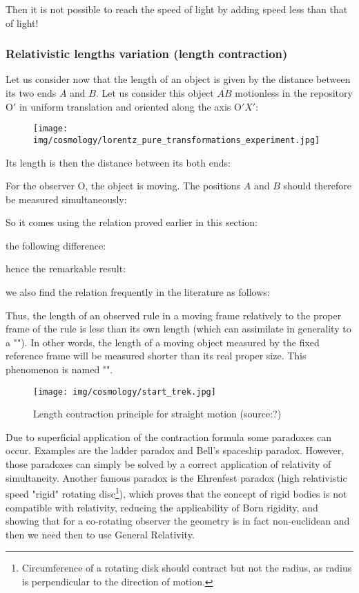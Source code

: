 	Then it is not possible to reach the speed of light by adding speed less than that of light!
	
	\subsubsection{Relativistic lengths variation (length contraction)}
	Let us consider now that the length of an object is given by the distance between its two ends $A$ and $B$. Let us consider this object $\overline{AB}$ motionless in the repository $\text{O}'$ in uniform translation and oriented along the axis $\text{O}'X'$:
	\begin{figure}[H]
		\centering
		\texttt{[image: img/cosmology/lorentz\_pure\_transformations\_experiment.jpg]}	
	\end{figure}
	Its length is then the distance between its both ends:
	
	For the observer O, the object is moving. The positions $A$ and $B$ should therefore be measured simultaneously:
	
	So it comes using the relation proved earlier in this section:
	
	the following difference:
	
	hence the remarkable result:
	
	we also find the relation frequently in the literature as follows:
	
	Thus, the length of an observed rule in a moving frame relatively to the proper frame of the rule is less than its own length (which can assimilate in generality to a ""). In other words, the length of a moving object measured by the fixed reference frame will be measured shorter than its real proper size. This phenomenon is named "".
	\begin{figure}[H]
		\centering
		\texttt{[image: img/cosmology/start\_trek.jpg]}	
		\caption[Length contraction principle for straight motion]{Length contraction principle for straight motion (source:?)}
	\end{figure}
	Due to superficial application of the contraction formula some paradoxes can occur. Examples are the ladder paradox and Bell's spaceship paradox. However, those paradoxes can simply be solved by a correct application of relativity of simultaneity. Another famous paradox is the Ehrenfest paradox (high relativistic speed "rigid" rotating disc\footnote{Circumference of a rotating disk should contract but not the radius, as radius is perpendicular to the direction of motion.}), which proves that the concept of rigid bodies is not compatible with relativity, reducing the applicability of Born rigidity, and showing that for a co-rotating observer the geometry is in fact non-euclidean and then we need then to use General Relativity.
	
